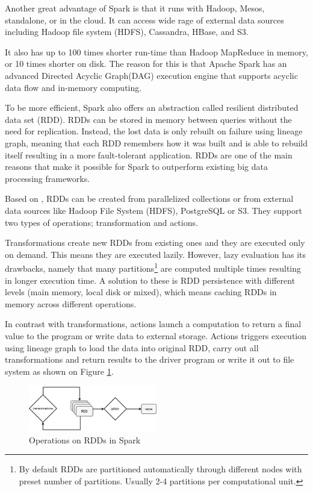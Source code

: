 Another great advantage of Spark is that it runs with Hadoop, Mesos, standalone, or in the cloud. It can access wide rage of external data sources including Hadoop file system (HDFS), Cassandra, HBase, and S3. 

It also has up to 100 times shorter run-time than Hadoop MapReduce in memory, or 10 times shorter on disk. The reason for this is that Apache Spark has an advanced Directed Acyclic Graph(DAG) execution engine that supports acyclic data flow and in-memory computing.\cite{spark}

To be more efficient, Spark also offers an abstraction called resilient distributed data set (RDD). RDDs can be stored in memory between queries without the need for replication. Instead, the lost data is only rebuilt on failure using lineage graph, meaning that each RDD remembers how it was built and is able to rebuild itself resulting in a more fault-tolerant application. RDDs are one of the main reasons that make it possible for Spark to outperform existing big data processing frameworks. \cite{spark}

Based on \cite{spark:rdds}, RDDs can be created from parallelized collections or from external data sources like Hadoop File System (HDFS), PostgreSQL or S3. They support two types of operations; transformation and actions.

Transformations create new RDDs from existing ones and they are executed only on demand. This means they are executed lazily. However, lazy evaluation has its drawbacks, namely that many partitions\footnote{By default RDDs are partitioned automatically  through different nodes with preset number of partitions. Usually 2-4 partitions per computational unit.} are computed multiple times resulting in longer execution time. A solution to these is RDD persistence with different levels (main memory, local disk or mixed), which means caching RDDs in memory across different operations. 
 
In contrast with transformations, actions launch a computation to return a final value to the program or write data to external storage. Actions triggers execution using lineage graph to load the data into original RDD, carry out all transformations and return  results to the driver program or write it out to file system as shown on Figure \ref{fig:spark-ops}.

\begin{figure}[h]
    \centering
    \includegraphics[width=0.5\textwidth]{images/operations_spark.png}
    \caption{Operations on RDDs in Spark}
    \label{fig:spark-ops}
\end{figure}

